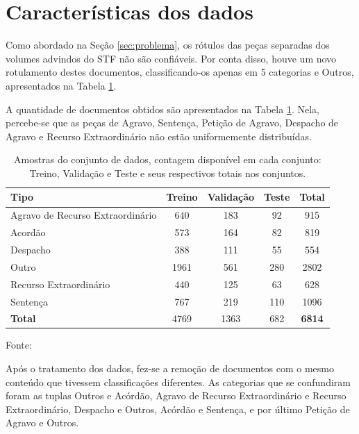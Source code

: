 \section{Características dos dados}

Como abordado na Seção \ref{sec:problema}, os rótulos das peças separadas dos volumes advindos do STF não são confiáveis. Por conta disso, houve um novo rotulamento destes documentos, classificando-os apenas em 5 categorias e Outros, apresentados na Tabela \ref{tab:categoriasPecas}.

A quantidade de documentos obtidos são apresentados na Tabela \ref{tab:categoriasPecas}. Nela, percebe-se que as peças de Agravo, Sentença, Petição de Agravo, Despacho de Agravo e Recurso Extraordinário não estão uniformemente distribuídas.

\begin{table}[ht]
	\centering    
	\caption[Amostras do conjunto de dados]{Amostras do conjunto de dados, contagem disponível em cada conjunto: Treino, Validação e Teste e seus respectivos totais nos conjuntos.}
    \label{tab:categoriasPecas}
	\begin{tabular}{|l|c|c|c|c|}
        \hline
        \textbf{Tipo} & \textbf{Treino} & \textbf{Validação} & \textbf{Teste} & \textbf{Total}\\ 
        \hline
        Agravo de Recurso Extraordinário &  640 & 183 & 92 & 915 \\
        \hline
        Acordão & 573 & 164 & 82 & 819 \\
        \hline
        Despacho & 388 & 111 & 55 & 554 \\
        \hline
        Outro & 1961 & 561 & 280 & 2802 \\
        \hline
        Recurso Extraordinário & 440 & 125 & 63 & 628 \\
        \hline
        Sentença & 767 & 219 & 110 & 1096 \\
        \hline
        \textbf{Total} & 4769 & 1363 & 682 & \textbf{6814} \\
        \hline

    \end{tabular}\par Fonte: 
\end{table}

Após o tratamento dos dados, fez-se a remoção de  documentos com o mesmo conteúdo que tivessem classificações diferentes. As categorias que se confundiram foram as tuplas Outros e Acórdão, Agravo de Recurso Extraordinário e Recurso Extraordinário, Despacho e Outros, Acórdão e Sentença, e por último Petição de Agravo e Outros.

